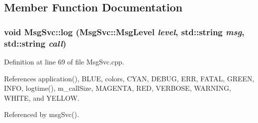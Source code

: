 \subsection{Member Function Documentation}
\hypertarget{classMsgSvc_ad16d082e1bed97d14344d4942664d370}{
\subsubsection[{log}]{\setlength{\rightskip}{0pt plus 5cm}void MsgSvc::log ({\bf MsgSvc::MsgLevel} {\em level}, \/  std::string {\em msg}, \/  std::string {\em call})}}
\label{classMsgSvc_ad16d082e1bed97d14344d4942664d370}


Definition at line 69 of file MsgSvc.cpp.

References application(), BLUE, colors, CYAN, DEBUG, ERR, FATAL, GREEN, INFO, logtime(), m\_\-callSize, MAGENTA, RED, VERBOSE, WARNING, WHITE, and YELLOW.

Referenced by msgSvc().


